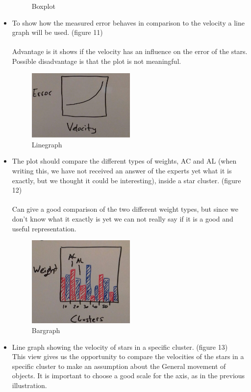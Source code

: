 \documentclass{article}
\begin{document}
\begin{itemize}
\begin{figure}[!h]
	\caption{Boxplot }
	\label{fig10}
\end{figure}
\item To show how the measured error behaves in comparison to the velocity a line graph will be used. (figure 11)\\
\\
Advantage is it shows if the velocity has an influence on the error of the stars. Possible disadvantage is that the plot is not meaningful.
\begin{figure}[!h]
\centering
\includegraphics[width=0.5\textwidth]{images/VelocityError.jpg}
	\caption{Linegraph  }
	\label{fig11}
\end{figure}
\newpage\item The plot should compare the different types of weights, AC and AL (when writing this, we have not received an answer of the experts yet what it is exactly, but we thought it could be interesting), inside a star cluster. (figure 12)\\
\\
Can give a good comparison of the two different weight types, but since we don't know what it exactly is yet we can not really say if it is a good and useful representation.
\begin{figure}[!h]
\centering
\includegraphics[width=0.5\textwidth]{images/ClustersWeight.jpg}
	\caption{Bargraph  }
	\label{fig12}
\end{figure}


\item Line graph showing the velocity of stars in a specific cluster. (figure 13)\\
This view gives us the opportunity to compare the velocities of the stars in a specific cluster to make an assumption about the General movement of objects. It is important to choose a good scale for the axis, as in the previous illustration. 
\end{itemize}
\end{document}
